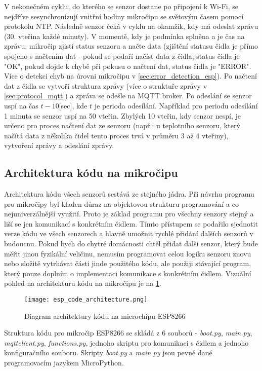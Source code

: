 V nekonečném cyklu, do kterého se senzor dostane po připojení k Wi-Fi, se nejdříve sesynchronizují vnitřní hodiny mikročipu se světovým časem pomocí protokolu NTP. Následně senzor čeká v cyklu na okamžik, kdy má odeslat zprávu (30. vteřina každé minuty). V momentě, kdy je podmínka splněna a je čas na zprávu, mikročip zjistí status senzoru a načte data (zjištění statusu čidla je přímo spojeno s načtením dat - pokud se podaří načíst data z čidla, status čidla je "OK", pokud dojde k chybě při pokusu o načtení dat, status čidla je "ERROR". Více o detekci chyb na úrovni mikročipu v \cref{sec:error_detection_esp}). Po načtení dat z čidla se vytvoří struktura zprávy (více o struktuře zprávy v \cref{sec:protocol_mqtt}) a zpráva se odešle na MQTT broker. Po odeslání se senzor uspí na čas $t-10$[sec], kde $t$ je perioda odesílání. Například pro periodu odesílání 1 minuta se senzor uspí na 50 vteřin. Zbylých 10 vteřin, kdy senzor nespí, je určeno pro proces načtení dat ze senzoru (např.: u teplotního senzoru, který načítá data z několika čidel tento proces trvá v průměru 3 až 4 vteřiny), vytvoření zprávy a odeslání zprávy.

\subsection*{Architektura kódu na mikročipu}
Architektura kódu všech senzorů sestává ze stejného jádra. Při návrhu programu pro mikročipy byl kladen důraz na objektovou strukturu programování a co nejuniverzálnější využití. Proto je základ programu pro všechny senzory stejný a liší se jen komunikací s konkrétním čidlem. Tímto přístupem se podařilo sjednotit verze kódu ve všech senzorech a hlavně umožnit rychlé přidání dalších senzorů v budoucnu. Pokud bych do chytré domácnosti chtěl přidat další senzor, který bude měřit jinou fyzikální veličinu, nemusím programovat celou logiku senzoru znovu nebo složitě vytrhávat části jinde použitého kódu, ale použiji stávající program, který pouze doplním o implementaci komunikace s konkrétním čidlem. Vizuální pohled na architekturu kódu na mikročipu je na \cref{fig:esp_code_architecture}. 

\begin{figure}[H]
  \centering
  \texttt{[image: esp\_code\_architecture.png]}
  \caption{Diagram architektury kódu na microchipu ESP8266}
  \label{fig:esp_code_architecture}
\end{figure}

Struktura kódu pro mikročip ESP8266 se skládá z 6 souborů - \textit{boot.py}, \textit{main.py}, \textit{mqttclient.py}, \textit{functions.py}, jednoho skriptu pro komunikaci s čidlem a jednoho konfiguračního souboru. Skripty \textit{boot.py} a \textit{main.py} jsou pevně dané programovacím jazykem MicroPython. 
 
